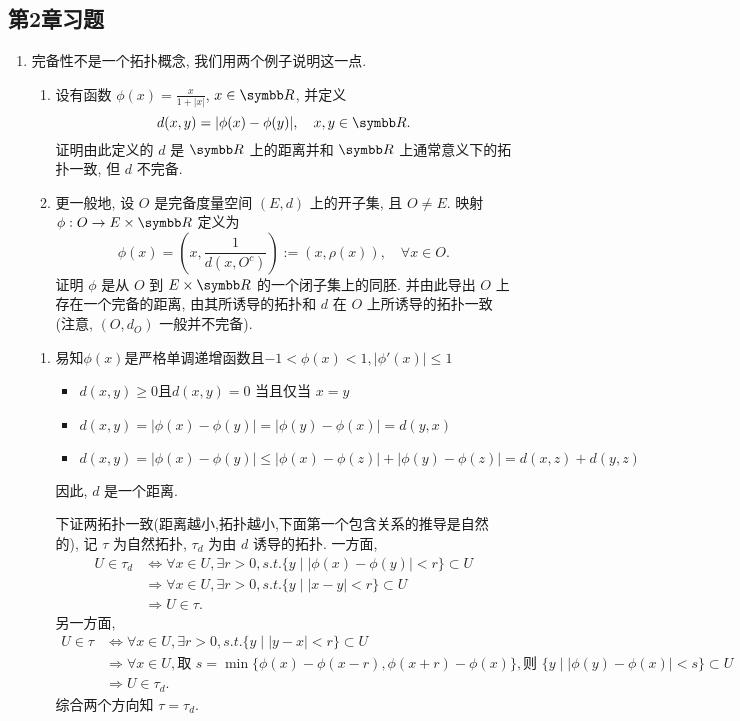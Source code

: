 \subsection{第2章习题}
\begin{enumerate}
  \item 完备性不是一个拓扑概念, 我们用两个例子说明这一点.
    \begin{enumerate}
      \item 设有函数 $\phi(x)=\frac{x}{1+|x|}$, $x\in\R$, 并定义
      \[d(x,y)=|\phi(x)-\phi(y)|,\quad x,y\in\R.\]
      证明由此定义的 $d$ 是 $\R$ 上的距离并和 $\R$ 上通常意义下的拓扑一致, 但 $d$ 不完备.
    
      \item 更一般地, 设 $O$ 是完备度量空间 $(E,d)$ 上的开子集, 且 $O\neq E$.
      映射 $\phi:O\to E\times\R$ 定义为
      \[\phi(x)=\left(x,\frac{1}{d(x,O^c)}\right):=(x,\rho(x)),\quad\forall x\in O.\]
      证明 $\phi$ 是从 $O$ 到 $E\times\R$ 的一个闭子集上的同胚. 并由此导出 $O$ 上存在一个完备的距离,
      由其所诱导的拓扑和 $d$ 在 $O$ 上所诱导的拓扑一致 (注意, $(O,d_O)$ 一般并不完备).
    \end{enumerate}
    \begin{answer}
      \begin{enumerate}
        \item 易知$\phi (x)$是严格单调递增函数且$-1<\phi(x)<1,|\phi '(x)|\leq 1$
        \begin{itemize}
        \item $d(x,y)\geq 0$且$d(x,y)=0$ 当且仅当 $x=y$
        \item $d(x,y)=|\phi(x)-\phi(y)|=|\phi(y)-\phi(x)|=d(y,x)$
        \item $d(x,y)=|\phi(x)-\phi(y)|\leq |\phi(x)-\phi(z)|+|\phi(y)-\phi(z)|=d(x,z)+d(y,z)$
        \end{itemize}
        因此, $d$ 是一个距离.
    
        下证两拓扑一致(距离越小,拓扑越小,下面第一个包含关系的推导是自然的), 
        记 $\tau$ 为自然拓扑, $\tau_d$ 为由 $d$ 诱导的拓扑. 一方面,
        \begin{align*}
            U\in\tau_d
            & \Leftrightarrow\forall x\in U,\exists r>0,s.t.\{y\mid|\phi(x)-\phi(y)|<r\}\subset U\\
            & \Rightarrow\forall x\in U,\exists r>0,s.t.\{y\mid|x-y|<r\}\subset U\\
            & \Rightarrow U\in\tau.
        \end{align*}
        另一方面,
        \begin{align*}
        U\in\tau
        & \Leftrightarrow\forall x\in U,\exists r>0,s.t.\{y\mid |y-x|<r\}\subset U\\
        & \Rightarrow\forall x\in U,\text{取\ }s=\min\{\phi(x)-\phi(x-r),\phi(x+r)-\phi(x)\},\text{则\ }\{y\mid |\phi(y)-\phi(x)|<s\}\subset U\\
        & \Rightarrow U\in\tau_d.
        \end{align*}
        综合两个方向知 $\tau=\tau_d$.
    

\end{enumerate}
\end{answer}
\end{enumerate}
